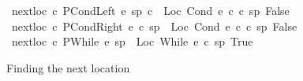 \begin{isabellebody}
\begin{figure}[h!]
{\isacharbar}\ {\isachardoublequoteopen}next{\isacharunderscore}loc\ c\ {\isacharparenleft}PCondLeft\ e\ sp\ c\ {\isacharequal}\ {\isacharparenleft}Loc\ {\isacharparenleft}Cond\ e\ c\ c\ sp{\isacharcomma}\ False{\isacharparenright}{\isachardoublequoteclose}\isanewline
{\isacharbar}\ {\isachardoublequoteopen}next{\isacharunderscore}loc\ c\ {\isacharparenleft}PCondRight\ e\ c\ sp{\isacharparenright}\ {\isacharequal}\ {\isacharparenleft}Loc\ {\isacharparenleft}Cond\ e\ c\ c{\isacharparenright}\ sp{\isacharcomma}\ False{\isacharparenright}{\isachardoublequoteclose}\isanewline
{\isacharbar}\ {\isachardoublequoteopen}next{\isacharunderscore}loc\ c\ {\isacharparenleft}PWhile\ e\ sp{\isacharparenright}\ {\isacharequal}\ {\isacharparenleft}Loc\ {\isacharparenleft}While\ e\ c{\isacharparenright}\ sp{\isacharcomma}\ True{\isacharparenright}{\isachardoublequoteclose}\newline
\figline{}
\caption{Finding the next location}\label{fig:next_loc}
\end{figure}
\isadelimproof
\endisadelimproof
\isatagproof
\endisatagproof
{\isafoldproof}\isadelimproof
\endisadelimproof
\begin{figure}[h!]
\isastyleminor\isamarkuptrue
\figline{}
\begin{isamarkuptext}\begin{center}
\begin{small}
\\[2ex]
\\[2ex]
\\[2ex]

\end{small}
\end{center}
\end{isamarkuptext}
\end{figure}
\end{isabellebody}

